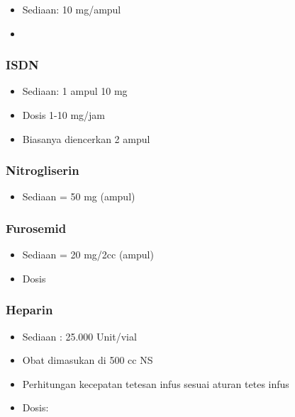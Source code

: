 \documentclass[
]{book}
\providecommand{\tightlist}{%
  \setlength{\itemsep}{0pt}\setlength{\parskip}{0pt}}
\begin{document}
\begin{itemize}
\tightlist
\item
  Sediaan: 10 mg/ampul
\item
\end{itemize}

\hypertarget{isdn}{%
\subsubsection{ISDN}\label{isdn}}

\begin{itemize}
\tightlist
\item
  Sediaan: 1 ampul 10 mg
\item
  Dosis 1-10 mg/jam
\item
  Biasanya diencerkan 2 ampul
\end{itemize}

\hypertarget{nitrogliserin}{%
\subsubsection{Nitrogliserin}\label{nitrogliserin}}

\begin{itemize}
\tightlist
\item
  Sediaan = 50 mg (ampul)
\end{itemize}

\hypertarget{furosemid}{%
\subsubsection{Furosemid}\label{furosemid}}

\begin{itemize}
\tightlist
\item
  Sediaan = 20 mg/2cc (ampul)
\item
  Dosis
\end{itemize}

\hypertarget{heparin}{%
\subsubsection{Heparin}\label{heparin}}

\begin{itemize}
\tightlist
\item
  Sediaan : 25.000 Unit/vial
\item
  Obat dimasukan di 500 cc NS
\item
  Perhitungan kecepatan tetesan infus sesuai aturan tetes infus
\item
  Dosis:
\end{itemize}
\end{document}
